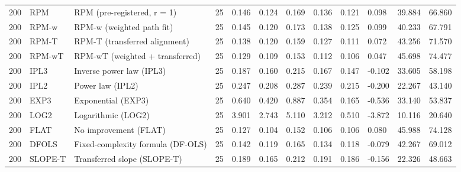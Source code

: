 \begin{tabular}{llllllllllll}
200 & RPM & RPM (pre-registered, r = 1) & 25 & 0.146 & 0.124 & 0.169 & 0.136 & 0.121 & 0.098 & 39.884 & 66.860 \\
200 & RPM-w & RPM-w (weighted path fit) & 25 & 0.145 & 0.120 & 0.173 & 0.138 & 0.125 & 0.099 & 40.233 & 67.791 \\
200 & RPM-T & RPM-T (transferred alignment) & 25 & 0.138 & 0.120 & 0.159 & 0.127 & 0.111 & 0.072 & 43.256 & 71.570 \\
200 & RPM-wT & RPM-wT (weighted + transferred) & 25 & 0.129 & 0.109 & 0.153 & 0.112 & 0.106 & 0.047 & 45.698 & 74.477 \\
200 & IPL3 & Inverse power law (IPL3) & 25 & 0.187 & 0.160 & 0.215 & 0.167 & 0.147 & -0.102 & 33.605 & 58.198 \\
200 & IPL2 & Power law (IPL2) & 25 & 0.247 & 0.208 & 0.287 & 0.239 & 0.215 & -0.200 & 22.267 & 43.140 \\
200 & EXP3 & Exponential (EXP3) & 25 & 0.640 & 0.420 & 0.887 & 0.354 & 0.165 & -0.536 & 33.140 & 53.837 \\
200 & LOG2 & Logarithmic (LOG2) & 25 & 3.901 & 2.743 & 5.110 & 3.212 & 0.510 & -3.872 & 10.116 & 20.640 \\
200 & FLAT & No improvement (FLAT) & 25 & 0.127 & 0.104 & 0.152 & 0.106 & 0.106 & 0.080 & 45.988 & 74.128 \\
200 & DFOLS & Fixed-complexity formula (DF-OLS) & 25 & 0.142 & 0.119 & 0.165 & 0.134 & 0.118 & -0.079 & 42.267 & 69.012 \\
200 & SLOPE-T & Transferred slope (SLOPE-T) & 25 & 0.189 & 0.165 & 0.212 & 0.191 & 0.186 & -0.156 & 22.326 & 48.663 \\
\hline
\end{tabular}
